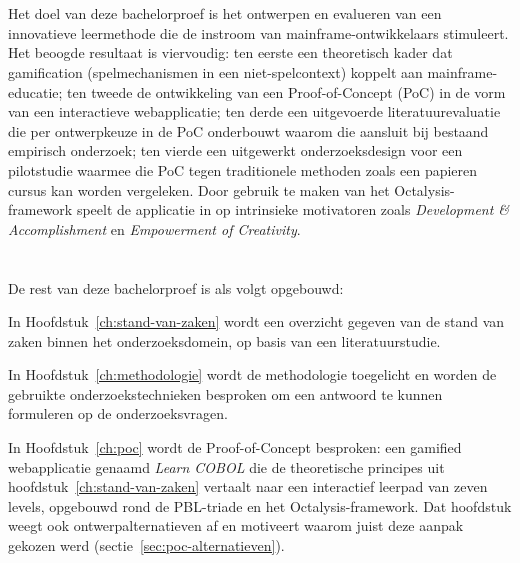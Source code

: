 \section{}%
\label{sec:onderzoeksdoelstelling}

Het doel van deze bachelorproef is het ontwerpen en evalueren van een innovatieve leermethode die de instroom van mainframe-ontwikkelaars stimuleert.
Het beoogde resultaat is viervoudig:
ten eerste een theoretisch kader dat gamification (spelmechanismen in een niet-spelcontext) koppelt aan mainframe-educatie;
ten tweede de ontwikkeling van een Proof-of-Concept (PoC) in de vorm van een interactieve webapplicatie;
ten derde een uitgevoerde literatuurevaluatie die per ontwerpkeuze in de PoC onderbouwt waarom die aansluit bij bestaand empirisch onderzoek;
ten vierde een uitgewerkt onderzoeksdesign voor een pilotstudie waarmee die PoC tegen traditionele methoden zoals een papieren cursus kan worden vergeleken.
Door gebruik te maken van het Octalysis-framework \autocite{Chou2015} speelt de applicatie in op intrinsieke motivatoren zoals \textit{Development \& Accomplishment} en \textit{Empowerment of Creativity}.

\section{}%
\label{sec:opzet-bachelorproef}

De rest van deze bachelorproef is als volgt opgebouwd:

In Hoofdstuk~\ref{ch:stand-van-zaken} wordt een overzicht gegeven van de stand van zaken binnen het onderzoeksdomein, op basis van een literatuurstudie.

In Hoofdstuk~\ref{ch:methodologie} wordt de methodologie toegelicht en worden de gebruikte onderzoekstechnieken besproken om een antwoord te kunnen formuleren op de onderzoeksvragen.

In Hoofdstuk~\ref{ch:poc} wordt de Proof-of-Concept besproken: een gamified webapplicatie genaamd \textit{Learn COBOL} die de theoretische principes uit hoofdstuk~\ref{ch:stand-van-zaken} vertaalt naar een interactief leerpad van zeven levels, opgebouwd rond de PBL-triade en het Octalysis-framework. Dat hoofdstuk weegt ook ontwerpalternatieven af en motiveert waarom juist deze aanpak gekozen werd (sectie~\ref{sec:poc-alternatieven}).

